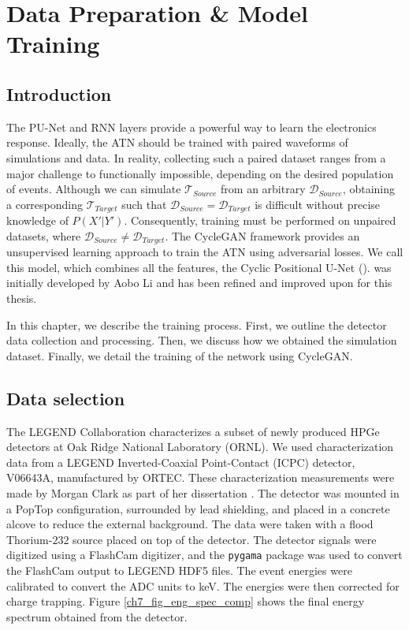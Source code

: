 \chapter{Data Preparation \& Model Training} \label{chap:training}

\section{Introduction}
The PU-Net and RNN layers provide a powerful way to learn the electronics response. Ideally, the ATN should be trained with paired waveforms of simulations and data. In reality, collecting such a paired dataset ranges from a major challenge to functionally impossible, depending on the desired population of events. Although we can simulate $\mathcal{T}_{Source}$ from an arbitrary $\mathcal{D}_{Source}$, obtaining a corresponding $\mathcal{T}_{Target}$ such that $\mathcal{D}_{Source} = \mathcal{D}_{Target}$ is difficult without precise knowledge of $P(X'|Y')$. Consequently, training must be performed on unpaired datasets, where $\mathcal{D}_{Source} \neq \mathcal{D}_{Target}$. The CycleGAN framework \cite{CycleGAN} provides an unsupervised learning approach to train the ATN using adversarial losses. We call this model, which combines all the features, the Cyclic Positional U-Net ({\cpunet}). {\cpunet} was initially developed by Aobo Li and has been refined and improved upon for this thesis. 

In this chapter, we describe the {\cpunet} training process. First, we outline the detector data collection and processing. Then, we discuss how we obtained the simulation dataset. Finally, we detail the training of the network using CycleGAN.

\section{Data selection}
The LEGEND Collaboration characterizes a subset of newly produced HPGe detectors at Oak Ridge National Laboratory (ORNL). We used characterization data from a LEGEND Inverted-Coaxial Point-Contact (ICPC) detector, V06643A, manufactured by ORTEC. These characterization measurements were made by Morgan Clark as part of her dissertation \cite{clark2023phdthesis}. The detector was mounted in a PopTop configuration, surrounded by lead shielding, and placed in a concrete alcove to reduce the external background. The data were taken with a flood Thorium-$232$ source placed on top of the detector. The detector signals were digitized using a FlashCam digitizer, and the \texttt{pygama} package \cite{pygama} was used to convert the FlashCam output to LEGEND HDF5 files.  The event energies were calibrated to convert the ADC units to keV. The energies were then corrected for charge trapping. Figure \ref{ch7_fig_eng_spec_comp} shows the final energy spectrum obtained from the detector.

